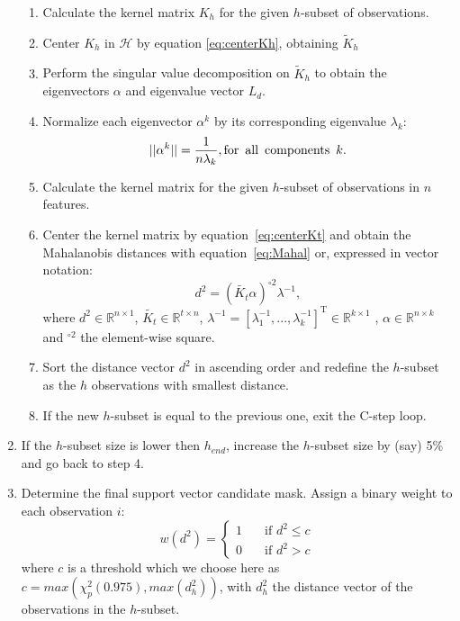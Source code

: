 \documentclass[preprint,12pt]{elsarticle}
\begin{document}
\begin{enumerate}
		\begin{enumerate}
			\item Calculate the kernel matrix $K_h$ for the given $h$-subset of observations.
			\item Center $K_h$ in $\mathcal{H}$ by equation \ref{eq:centerKh}, obtaining $\tilde{K}_h$
			\item Perform the singular value decomposition on $\tilde{K}_h$ to obtain the eigenvectors $\alpha$ and eigenvalue vector $L_d$.
			\item Normalize each eigenvector $\alpha^k$ by its corresponding eigenvalue $\lambda_k$:
			\begin{equation}
			||\alpha^k|| = \frac{1}{n\lambda_k}, \mathrm{for \enskip all \enskip components \enskip}k.
			\end{equation}
			\item Calculate the kernel matrix for the given $h$-subset of observations in $n$ features.
			\item Center the kernel matrix by equation~\eqref{eq:centerKt} and obtain the Mahalanobis distances with equation~\eqref{eq:Mahal} or, expressed in vector notation:
			\begin{equation}
				d^2  = (\tilde{K_t}\alpha)^{\circ 2}\lambda^{-1},
			\end{equation}
			where  $d^2 \in \mathbb{R}^{n \times 1}$, $ \tilde{K_t} \in \mathbb{R}^{t \times n}$, $\lambda^{-1} = [\lambda_1^{-1} ,...,\lambda_k^{-1}]^\mathrm{T} \in \mathbb{R}^{k \times 1}$ , $\alpha \in \mathbb{R}^{n \times k}$ and $^{\circ 2}$ the 
			element-wise square.
			\item Sort the distance vector $d^2$ in ascending order and redefine the $h$-subset as the $h$ observations with smallest distance.
			\item If the new $h$-subset is equal to the previous one, exit the C-step loop.
		\end{enumerate}
		
		\item  If the $h$-subset size is lower then $h_{end}$, increase the $h$-subset size by (say) 5\% and go back to step 4. 
		\item  Determine the final support vector candidate mask. Assign a binary weight to each observation $i$:
		\begin{equation}
			w(d^2)  =
			\begin{cases}
			1       & \quad \text{if } d^2 \leq c \\
			0  & \quad \text{if } d^2 >c
			\end{cases}
		\end{equation}
		where $c$ is a threshold which we choose here as $c = max(\chi_p^2(0.975), max(d_h^2) )$, with $d_h^2$ the distance vector of the observations in the $h$-subset. 
	\end{enumerate}
	
\end{document}
